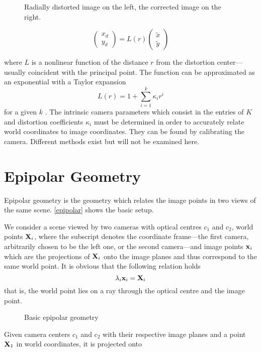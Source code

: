 \begin{figure}
   {\centering      
      
   \caption{Radially distorted image on the left, the corrected image on the
   right.}
   \label{distortion}}
\end{figure}


\begin{equation}
   \begin{pmatrix}
      x_d \\ y_d
   \end{pmatrix} = L(r)\begin{pmatrix}
      \tilde{x} \\ \tilde{y}
   \end{pmatrix}
\end{equation}

where $L$ is a nonlinear function of the distance $r$ from the distortion
center---usually coincident with the principal point. The function can be
approximated as an exponential with a Taylor expansion
\begin{equation}
   L(r) = 1 + \sum\limits_{i=1}^k \kappa_i r^i
\end{equation}
for a given $k$ \citep[see][chapter 7.4]{h&z2004}. The intrinsic camera
parameters which consist in the entries of $K$ and distortion coefficients
$\kappa_i$ must be determined in order to accurately relate world coordinates to
image coordinates. They can be found by calibrating the camera. Different
methods exist \citep[e.g][]{zhang2000} but will not be examined here.

\section{Epipolar Geometry}

Epipolar geometry is the geometry which relates the image points in two views of
the same scene. \autoref{epipolar} shows the basic setup. 

We consider a scene viewed by two cameras with optical centres $c_1$ and $c_2$,
world points $\mathbf{X}_i$, where the subscript denotes the coordinate
frame---the first camera, arbitrarily chosen to be the left one, or the second
camera---and image points $\mathbf{x}_i$ which are the projections of $\mathbf{X}_i$
onto the image planes and thus correspond to the same world point. 
It is obvious that the following relation holds
\begin{equation}
   \lambda_i\mathbf{x}_i = \mathbf{X}_i
\end{equation}
that is, the world point lies on a ray through the optical centre and the image
point. 

\begin{figure}[h]
   {\centering      
      
      \caption{Basic epipolar geometry}
   \label{epipolar}}
\end{figure}

Given camera centers $c_1$ and $c_2$ with their respective image planes  and a point $\mathbf{X}_1$ in world
coordinates, it is projected onto
